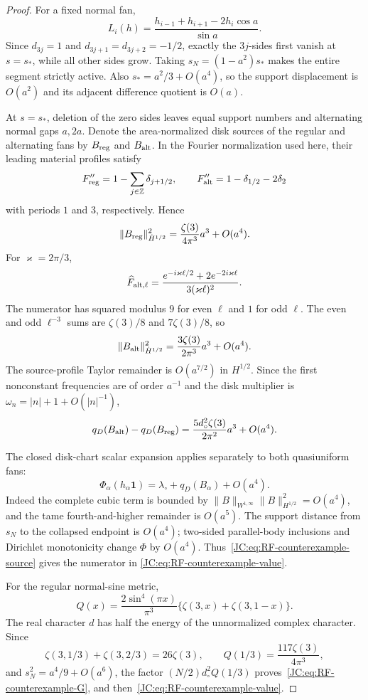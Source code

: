 \begin{contract}
\begin{proof}
For a fixed normal fan,
\[
 L_i(h)=\frac{h_{i-1}+h_{i+1}-2h_i\cos a}{\sin a}.
\]
Since \(d_{3j}=1\) and \(d_{3j+1}=d_{3j+2}=-1/2\), exactly the
\(3j\)-sides first vanish at \(s=s_*\), while all other sides grow.
Taking \(s_N=(1-a^2)s_*\) makes the entire segment strictly active.
Also \(s_*=a^2/3+O(a^4)\), so the support displacement is \(O(a^2)\)
and its adjacent difference quotient is \(O(a)\).

At \(s=s_*\), deletion of the zero sides leaves equal support numbers and
alternating normal gaps \(a,2a\).  Denote the area-normalized disk sources
of the regular and alternating fans by \(B_{\rm reg}\) and \(B_{\rm alt}\).
In the Fourier normalization used here, their leading material profiles
satisfy
\[
 F_{\rm reg}''=1-\sum_{j\in\mathbb Z}\delta_{j+1/2},
\qquad
 F_{\rm alt}''=1-\delta_{1/2}-2\delta_2
\]
with periods \(1\) and \(3\), respectively.  Hence
\[
 \|B_{\rm reg}\|_{\dot H^{1/2}}^2
 =\frac{\zeta(3)}{4\pi^3}a^3+O(a^4).
\]
For \(\varkappa=2\pi/3\),
\[
 \widehat F_{{\rm alt},\ell}
 =\frac{e^{-i\varkappa\ell/2}+2e^{-2i\varkappa\ell}}
 {3(\varkappa\ell)^2}.
\]
The numerator has squared modulus \(9\) for even \(\ell\) and \(1\) for
odd \(\ell\).  The even and odd \(\ell^{-3}\) sums are
\(\zeta(3)/8\) and \(7\zeta(3)/8\), so
\[
 \|B_{\rm alt}\|_{\dot H^{1/2}}^2
 =\frac{3\zeta(3)}{2\pi^3}a^3+O(a^4).
\]
The source-profile Taylor remainder is \(O(a^{7/2})\) in \(H^{1/2}\).
Since the first nonconstant frequencies are of order \(a^{-1}\) and the
disk multiplier is \(\omega_n=|n|+1+O(|n|^{-1})\),
\begin{equation}\label{JC:eq:RF-counterexample-source}
 q_D(B_{\rm alt})-q_D(B_{\rm reg})
 =\frac{5d_\circ^2\zeta(3)}{2\pi^2}a^3+O(a^4).
\end{equation}

The closed disk-chart scalar expansion applies separately to both
quasiuniform fans:
\[
 \Phi_\alpha(h_\alpha\mathbf1)
 =\lambda_\circ+q_D(B_\alpha)+O(a^4).
\]
Indeed the complete cubic term is bounded by
\(\|B\|_{W^{1,\infty}}\|B\|_{H^{1/2}}^2=O(a^4)\), and the tame
fourth-and-higher remainder is \(O(a^5)\).  The support distance from
\(s_N\) to the collapsed endpoint is \(O(a^4)\); two-sided parallel-body
inclusions and Dirichlet monotonicity change \(\Phi\) by \(O(a^4)\).
Thus~\eqref{JC:eq:RF-counterexample-source} gives the numerator in
\eqref{JC:eq:RF-counterexample-value}.

For the regular normal-sine metric,
\[
 Q(x)=\frac{2\sin^4(\pi x)}{\pi^3}
 \{\zeta(3,x)+\zeta(3,1-x)\}.
\]
The real character \(d\) has half the energy of the unnormalized complex
character.  Since
\[
 \zeta(3,1/3)+\zeta(3,2/3)=26\zeta(3),\qquad
 Q(1/3)=\frac{117\zeta(3)}{4\pi^3},
\]
and \(s_N^2=a^4/9+O(a^6)\), the factor
\((N/2)d_\circ^2Q(1/3)\) proves~\eqref{JC:eq:RF-counterexample-G}, and
then~\eqref{JC:eq:RF-counterexample-value}.


\end{proof}
\end{contract}
